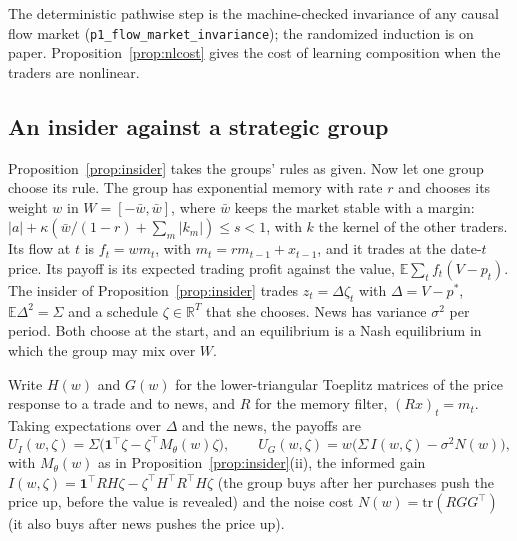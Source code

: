 \documentclass[12pt]{article}
\theoremstyle{definition}
\theoremstyle{remark}
\begin{document}
The deterministic pathwise step is the machine-checked invariance of any causal flow market (\texttt{p1\_flow\_market\_invariance}); the randomized induction is on paper. Proposition~\ref{prop:nlcost} gives the cost of learning composition when the traders are nonlinear.

\subsection{An insider against a strategic group}

Proposition~\ref{prop:insider} takes the groups' rules as given. Now let one group choose its rule. The group has exponential memory with rate $r$ and chooses its weight $w$ in $W=[-\bar w,\bar w]$, where $\bar w$ keeps the market stable with a margin: $|a|+\kappa(\bar w/(1-r)+\sum_m|k_m|)\le s<1$, with $k$ the kernel of the other traders. Its flow at $t$ is $f_t=wm_t$, with $m_t=rm_{t-1}+x_{t-1}$, and it trades at the date-$t$ price. Its payoff is its expected trading profit against the value, $\mathbb E\sum_tf_t(V-p_t)$. The insider of Proposition~\ref{prop:insider} trades $z_t=\Delta\zeta_t$ with $\Delta=V-p^*$, $\mathbb E\Delta^2=\Sigma$ and a schedule $\zeta\in\mathbb R^T$ that she chooses. News has variance $\sigma^2$ per period. Both choose at the start, and an equilibrium is a Nash equilibrium in which the group may mix over $W$.

Write $H(w)$ and $G(w)$ for the lower-triangular Toeplitz matrices of the price response to a trade and to news, and $R$ for the memory filter, $(R x)_t=m_t$. Taking expectations over $\Delta$ and the news, the payoffs are
\[
U_I(w,\zeta)=\Sigma\bigl(\mathbf 1^\top\zeta-\zeta^\top M_\theta(w)\zeta\bigr),\qquad
U_G(w,\zeta)=w\bigl(\Sigma\,I(w,\zeta)-\sigma^2N(w)\bigr),
\]
with $M_\theta(w)$ as in Proposition~\ref{prop:insider}(ii), the informed gain $I(w,\zeta)=\mathbf 1^\top RH\zeta-\zeta^\top H^\top R^\top H\zeta$ (the group buys after her purchases push the price up, before the value is revealed) and the noise cost $N(w)=\mathrm{tr}(RGG^\top)$ (it also buys after news pushes the price up).
\end{document}
